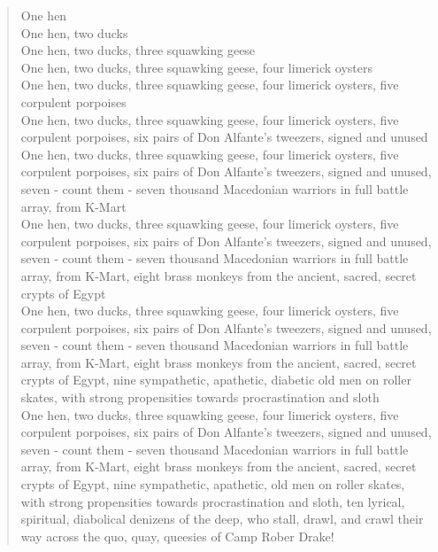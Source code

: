 
\begin{verse}
One hen \\

One hen, two ducks \\

One hen, two ducks, three squawking geese \\

One hen, two ducks, three squawking geese, four limerick oysters \\

One hen, two ducks, three squawking geese, four limerick oysters, five corpulent porpoises \\

One hen, two ducks, three squawking geese, four limerick oysters, five corpulent porpoises, six pairs of Don Alfante's tweezers, signed and unused \\

One hen, two ducks, three squawking geese, four limerick oysters, five corpulent porpoises, six pairs of Don Alfante's tweezers, signed and unused, seven - count them - seven thousand Macedonian warriors in full battle array, from K-Mart \\

One hen, two ducks, three squawking geese, four limerick oysters, five corpulent porpoises, six pairs of Don Alfante's tweezers, signed and unused, seven - count them - seven thousand Macedonian warriors in full battle array, from K-Mart, eight brass monkeys from the ancient, sacred, secret crypts of Egypt \\

One hen, two ducks, three squawking geese, four limerick oysters, five corpulent porpoises, six pairs of Don Alfante's tweezers, signed and unused, seven - count them - seven thousand Macedonian warriors in full battle array, from K-Mart, eight brass monkeys from the ancient, sacred, secret crypts of Egypt, nine sympathetic, apathetic, diabetic old men on roller skates, with strong propensities towards procrastination and sloth \\

One hen, two ducks, three squawking geese, four limerick oysters, five corpulent porpoises, six pairs of Don Alfante's tweezers, signed and unused, seven - count them - seven thousand Macedonian warriors in full battle array, from K-Mart, eight brass monkeys from the ancient, sacred, secret crypts of Egypt, nine sympathetic, apathetic, old men on roller skates, with strong propensities towards procrastination and sloth, ten lyrical, spiritual, diabolical denizens of the deep, who stall, drawl, and crawl their way across the quo, quay, queesies of Camp Rober Drake! \\
\end{verse}
